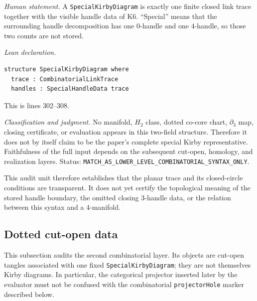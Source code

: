 \begin{enumerate}[label=\textbf{K\arabic*.},leftmargin=*]
\emph{Human statement.}
A \texttt{SpecialKirbyDiagram} is exactly one finite closed link trace together
with the visible handle data of K6.  ``Special'' means that the surrounding
handle decomposition has one $0$-handle and one $4$-handle, so those two counts
are not stored.

\emph{Lean declaration.}
\begin{verbatim}
structure SpecialKirbyDiagram where
  trace : CombinatorialLinkTrace
  handles : SpecialHandleData trace
\end{verbatim}
This is lines 302--308.

\emph{Classification and judgment.}
No manifold, $H_2$ class, dotted co-core chart, $\partial_3$ map, closing
certificate, or evaluation appears in this two-field structure.  Therefore it
does not by itself claim to be the paper's complete special Kirby
representative.  Faithfulness of the full input depends on the subsequent
cut-open, homology, and realization layers.  Status:
\nolinkurl{MATCH_AS_LOWER_LEVEL_COMBINATORIAL_SYNTAX_ONLY}.

\end{enumerate}

This audit unit therefore establishes that the planar trace and its
closed-circle conditions are transparent.  It does not yet certify the
topological meaning of the stored handle boundary, the omitted closing
$3$-handle data, or the relation between this syntax and a 4-manifold.

\subsection{Dotted cut-open data}
\label{app:lean-dotted-cut-input}

This subsection audits the second combinatorial layer.  Its objects are
cut-open tangles associated with one fixed \texttt{SpecialKirbyDiagram}; they
are not themselves Kirby diagrams.  In particular, the categorical projector
inserted later by the evaluator must not be confused with the combinatorial
\texttt{projectorHole} marker described below.

